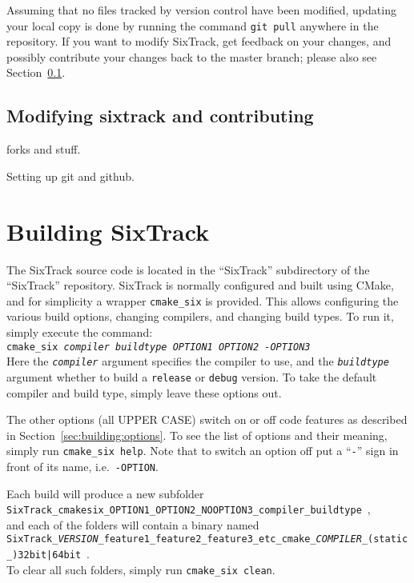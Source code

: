 \documentclass[english]{article}
\begin{document}
Assuming that no files tracked by version control have been modified, updating your local copy is done by running the command
\texttt{git pull} anywhere in the repository.
If you want to modify SixTrack, get feedback on your changes, and possibly contribute your changes back to the master branch; please also see Section~\ref{sec:downloading:contributing}.

\subsection{Modifying sixtrack and contributing}
\label{sec:downloading:contributing}


forks and stuff.

Setting up git and github.

\section{Building SixTrack}
\label{sec:building}

The SixTrack source code is located in the ``SixTrack'' subdirectory of the ``SixTrack'' repository.
SixTrack is normally configured and built using CMake, and for simplicity a wrapper \texttt{cmake\_six} is provided.
This allows configuring the various build options, changing compilers, and changing build types.
To run it, simply execute the command:\\
\texttt{cmake\_six \textit{compiler} \textit{buildtype} \textit{OPTION1} \textit{OPTION2} \textit{-OPTION3}}\\
Here the \texttt{\textit{compiler}} argument specifies the compiler to use, and the \texttt{\textit{buildtype}} argument whether to build a \texttt{release} or \texttt{debug} version.
To take the default compiler and build type, simply leave these options out.

The other options (all UPPER CASE) switch on or off code features as described in Section~\ref{sec:building:options}.
To see the list of options and their meaning, simply run \texttt{cmake\_six help}.
Note that to switch an option off put a ``\texttt{-}'' sign in front of its name, i.e.\ \texttt{-OPTION}.

Each build will produce a new subfolder\\
{
  \texttt{SixTrack\_\-cmakesix\_\-OPTION1\_\-OPTION2\_\-NOOPTION3\_\-compiler\_\-buildtype}~,\\
}
and each of the folders will contain a binary named\\
{\scriptsize
  \texttt{SixTrack\_\textit{VERSION}\_feature1\_feature2\_feature3\_etc\_cmake\_\textit{COMPILER}\_(static\_){32bit|64bit}}~.\\
}
To clear all such folders, simply run \texttt{cmake\_six clean}.
\end{document}

